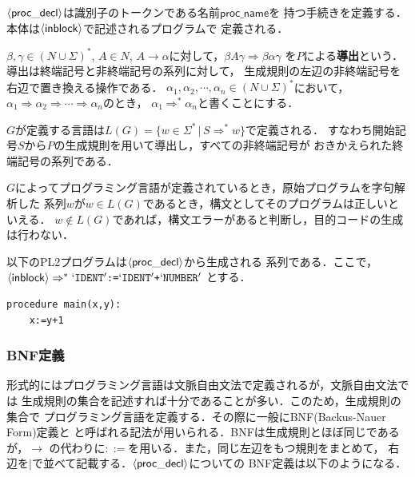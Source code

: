 \documentclass[a4j,dvipdfmx]{jbook}
\begin{document}
$\langle{\mathsf{proc\_decl}}\rangle$は識別子のトークンである名前$\mathsf{proc\_name}$を
持つ手続きを定義する．本体は$\langle{\mathsf{inblock}}\rangle$で記述されるプログラムで
定義される．

$\beta,\gamma\in(N\cup\Sigma)^\ast$,
$A\in N$, $A\rightarrow\alpha$に対して，$\beta A\gamma\Rightarrow \beta\alpha\gamma$
を$P$による{\bf 導出}という．導出は終端記号と非終端記号の系列に対して，
生成規則の左辺の非終端記号を右辺で置き換える操作である．
$\alpha_1,\alpha_2,\cdots,\alpha_n\in (N\cup\Sigma)^\ast$において，
$\alpha_1\Rightarrow\alpha_2\Rightarrow\cdots\Rightarrow\alpha_n$のとき，
$\alpha_1\Rightarrow^\ast\alpha_n$と書くことにする．

$G$が定義する言語は$L(G)=\{w\in\Sigma^\ast\,|\,S\Rightarrow^\ast w\}$で定義される．
すなわち開始記号$S$から$P$の生成規則を用いて導出し，すべての非終端記号が
おきかえられた終端記号の系列である．

$G$によってプログラミング言語が定義されているとき，原始プログラムを字句解析した
系列$w$が$w\in L(G)$であるとき，構文としてそのプログラムは正しいといえる．
$w\notin L(G)$であれば，構文エラーがあると判断し，目的コードの生成は行わない．

\begin{Exmp}\label{DerivEx1}
  以下のPL2プログラムは$\langle{\mathsf{proc\_decl}}\rangle$から生成される
  系列である．ここで，$\langle{\mathsf{inblock}}\rangle\Rightarrow^\ast
    `\texttt{IDENT}' \texttt{:=} `\texttt{IDENT}' \texttt{+} `\texttt{NUMBER}'$
  とする．
  \begin{Verbatim}[frame=single]
    procedure main(x,y):
    x:=y+1
  \end{Verbatim}
\end{Exmp}

\subsubsection{BNF定義}

形式的にはプログラミング言語は文脈自由文法で定義されるが，文脈自由文法では
生成規則の集合を記述すれば十分であることが多い．このため，生成規則の集合で
プログラミング言語を定義する．その際に一般にBNF(Backus-Nauer Form)定義と
と呼ばれる記法が用いられる．BNFは生成規則とほぼ同じであるが，$\rightarrow$
の代わりに$\mathtt{::=}$を用いる．また，同じ左辺をもつ規則をまとめて，
右辺を$\texttt{|}$で並べて記載する．$\langle{\mathsf{proc\_decl}}\rangle$についての
BNF定義は以下のようになる．
\end{document}
